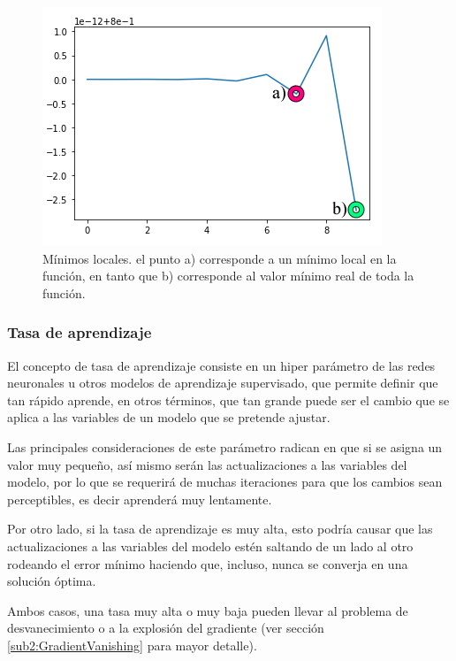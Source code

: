         \begin{figure}[ht!]
        	\centering
        	\includegraphics[width=0.6\linewidth]{imgs/02-Referential/02-localmin.png}
        	\caption[Mínimos locales]{Mínimos locales. el punto a) corresponde a un mínimo local en la función, en tanto que b) corresponde al valor mínimo real de toda la función.}
    	    \label{fig:LocalMin}
        \end{figure}%
        
        \subsubsection{Tasa de aprendizaje}
        \label{sub2:LearningRate}
            
            El concepto de tasa de aprendizaje consiste en un hiper parámetro de las redes neuronales u otros modelos de aprendizaje supervisado, que permite definir que tan rápido aprende, en otros términos, que tan grande puede ser el cambio que se aplica a las variables de un modelo que se pretende ajustar.
            
            Las principales consideraciones de este parámetro radican en que si se asigna un valor muy pequeño, así mismo serán las actualizaciones a las variables del modelo, por lo que se requerirá de muchas iteraciones para que los cambios sean perceptibles, es decir aprenderá muy lentamente.
            
            Por otro lado, si la tasa de aprendizaje es muy alta, esto podría causar que las actualizaciones a las variables del modelo estén saltando de un lado al otro rodeando el error mínimo haciendo que, incluso, nunca se converja en una solución óptima.
            
            Ambos casos, una tasa muy alta o muy baja pueden llevar al problema de desvanecimiento o a la explosión del gradiente (ver sección \ref{sub2:GradientVanishing} para mayor detalle).
        
